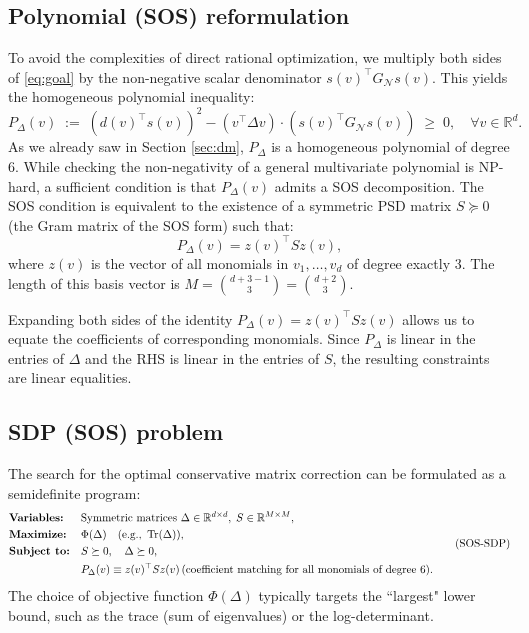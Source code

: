 \documentclass[pdflatex,sn-mathphys-num]{sn-jnl}%
\theoremstyle{thmstyleone}%
\theoremstyle{thmstyletwo}%
\theoremstyle{thmstylethree}%
\begin{document}
\subsection*{Polynomial (SOS) reformulation}
To avoid the complexities of direct rational optimization, we multiply both sides of \eqref{eq:goal} by the non-negative scalar denominator $s(v)^\top G_{\mathcal{N}} s(v)$. This yields the homogeneous polynomial inequality:
\[
P_\Delta(v) \;:=\; (d(v)^\top s(v))^2 - (v^\top\Delta v)\cdot (s(v)^\top G_{\mathcal{N}} s(v)) \;\ge\; 0, \quad \forall v \in \mathbb{R}^d.
\]
As we already saw in Section \ref{sec:dm}, $P_\Delta$ is a homogeneous polynomial of degree $6$. While checking the non-negativity of a general multivariate polynomial is NP-hard, a sufficient condition is that $P_\Delta(v)$ admits a SOS decomposition. The SOS condition is equivalent to the existence of a symmetric PSD matrix $S \succeq 0$ (the Gram matrix of the SOS form) such that:
\[
P_\Delta(v) = z(v)^\top S z(v),
\]
where $z(v)$ is the vector of all monomials in $v_1, \dots, v_d$ of degree exactly $3$. The length of this basis vector is $M = \binom{d+3-1}{3} = \binom{d+2}{3}$. 

Expanding both sides of the identity $P_\Delta(v) = z(v)^\top S z(v)$ allows us to equate the coefficients of corresponding monomials. Since $P_\Delta$ is linear in the entries of $\Delta$ and the RHS is linear in the entries of $S$, the resulting constraints are linear equalities.

\subsection*{SDP (SOS) problem} 
The search for the optimal conservative matrix correction can be formulated as a semidefinite program:
\[
\begin{aligned}
&\text{\textbf{Variables:}} && \text{Symmetric matrices } \Delta \in \mathbb{R}^{d\times d}, \; S \in \mathbb{R}^{M\times M},\\
&\text{\textbf{Maximize:}} && \Phi(\Delta) \quad (\text{e.g., } \operatorname{Tr}(\Delta)),\\
&\text{\textbf{Subject to:}} && S \succeq 0, \quad \Delta \succeq 0, \\
& && P_\Delta(v) \equiv z(v)^\top S z(v) \,(\text{coefficient matching for all monomials of degree 6}).
\end{aligned}
\tag{SOS-SDP}
\]
The choice of objective function $\Phi(\Delta)$ typically targets the ``largest" lower bound, such as the trace (sum of eigenvalues) or the log-determinant.
\end{document}
